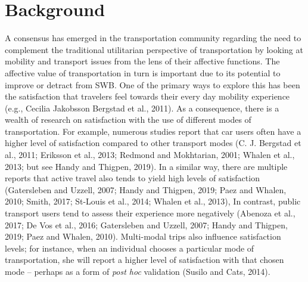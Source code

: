 \documentclass[]{elsarticle} %
\begin{document}
\hypertarget{background}{%
\section{Background}\label{background}}

A consensus has emerged in the transportation community regarding the
need to complement the traditional utilitarian perspective of
transportation by looking at mobility and transport issues from the lens
of their affective functions. The affective value of transportation in
turn is important due to its potential to improve or detract from SWB.
One of the primary ways to explore this has been the satisfaction that
travelers feel towards their every day mobility experience (e.g.,
Cecilia Jakobsson Bergstad et al., 2011). As a consequence, there is a
wealth of research on satisfaction with the use of different modes of
transportation. For example, numerous studies report that car users
often have a higher level of satisfaction compared to other transport
modes (C. J. Bergstad et al., 2011; Eriksson et al., 2013; Redmond and
Mokhtarian, 2001; Whalen et al., 2013; but see Handy and Thigpen, 2019).
In a similar way, there are multiple reports that active travel also
tends to yield high levels of satisfaction (Gatersleben and Uzzell,
2007; Handy and Thigpen, 2019; Paez and Whalen, 2010; Smith, 2017;
St-Louis et al., 2014; Whalen et al., 2013), In contrast, public
transport users tend to assess their experience more negatively (Abenoza
et al., 2017; De Vos et al., 2016; Gatersleben and Uzzell, 2007; Handy
and Thigpen, 2019; Paez and Whalen, 2010). Multi-modal trips also
influence satisfaction levels; for instance, when an individual chooses
a particular mode of transportation, she will report a higher level of
satisfaction with that chosen mode -- perhaps as a form of \emph{post
hoc} validation (Susilo and Cats, 2014).
\end{document}
